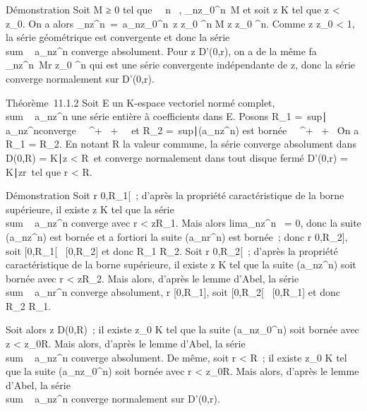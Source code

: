 \documentclass[]{article}
\begin{document}
Démonstration Soit M ≥ 0 tel que \forall~~n \in {}~,
\a_nz_0^n\
\leq M et soit z \in K tel que z \textless{}
z_0. On a alors
\a_nz^n\
=\
a_nz_0^n\
\left  z \over z_0
\right ^n \leq M\left
 z \over z_0 \right
^n. Comme \left  z
\over z_0 \right 
\textless{} 1, la série géométrique est convergente et donc la série
\\sum ~
a_nz^n converge absolument. Pour z \in D'(0,r), on a
de la même fa\ccon
\a_nz^n\
\leq M\left  r \over
z_0 \right ^n qui est une
série convergente indépendante de z, donc la série converge normalement
sur D'(0,r).

Théorème~11.1.2 Soit E un K-espace vectoriel normé complet,
\\sum ~
a_nz^n une série entière à coefficients dans E.
Posons R_1 =\
sup\z∣\\\sum
 a_nz^n\text converge
\ \in \mathbb{R}~^+ \cup\ +
\infty~\ et R_2 =\
sup\z∣(a_nz^n)\text
est bornée \ \in \mathbb{R}~^+ \cup\ +
\infty~\. On a R_1 = R_2. En notant R la
valeur commune, la série converge absolument dans D(0,R) =
\z \in K∣z
\textless{} R\ et converge normalement dans tout disque
fermé D'(0,r) = \z \in
K∣z\leq r\
tel que r \textless{} R.

Démonstration Soit r \in {[}0,R_1{[}~; d'après la propriété
caractéristique de la borne supérieure, il existe z \in K tel que la série
\\sum ~
a_nz^n converge avec r \textless{}
z\leq R_1. Mais alors
lima_nz^n~ = 0, donc la
suite (a_nz^n) est bornée et a fortiori la suite
(a_nr^n) est bornée~; donc r \in {[}0,R_2{]},
soit {[}0,R_1{[}\subset~ {[}0,R_2{]} et donc R_1 \leq
R_2. Soit r \in {[}0,R_2{[}~; d'après la propriété
caractéristique de la borne supérieure, il existe z \in K tel que la suite
(a_nz^n) soit bornée avec r \textless{}
z\leq R_2. Mais alors, d'après le lemme
d'Abel, la série \\sum ~
a_nr^n converge absolument, r \in
{[}0,R_1{]}, soit {[}0,R_2{[}\subset~ {[}0,R_1{]} et
donc R_2 \leq R_1.

Soit alors z \in D(0,R)~; il existe z_0 \in K tel que la suite
(a_nz_0^n) soit bornée avec
z \textless{} z_0\leq R.
Mais alors, d'après le lemme d'Abel, la série
\\sum ~
a_nz^n converge absolument. De même, soit r
\textless{} R~; il existe z_0 \in K tel que la suite
(a_nz_0^n) soit bornée avec r \textless{}
z_0\leq R. Mais alors, d'après le lemme
d'Abel, la série \\sum ~
a_nz^n converge normalement sur D'(0,r).
\end{document}
